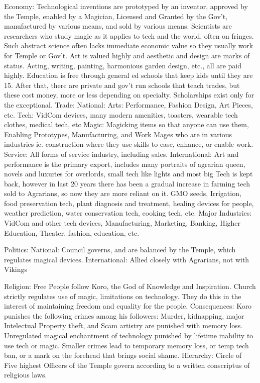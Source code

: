 \documentclass[blue]{GL2020}
\begin{document}
Economy:		Technological inventions are prototyped by an inventor, approved by the Temple, enabled by a
						Magician, Licensed and Granted by the Gov't, manufactured by various means, and sold by 
						various means.  Scientists are researchers who study magic as it applies to tech and the world, 
						often on fringes. Such abstract science often lacks immediate economic value 
						so they usually work for Temple or Gov't.  Art is valued highly and aesthetic and design are marks
						of status.  Acting, writing, painting, harmonious garden design, etc., all are paid highly.
						Education is free through general ed schools that keep kids until they are 15.  After that, there
						are private and gov't run schools that teach trades, but these cost money, more or less depending 
						on specialty.  Scholarships exist only for the exceptional.
	Trade:		National:		Arts:		Performance, Fashion Design, Art Pieces, etc.
												Tech:		VidCom devices, many modern amenities, toasters, wearable tech clothes, 
												medical tech, etc
												Magic:		Magicking items so that anyone can use them, Enabling Prototypes,
												Manufacturing, and Work Mages who are in various industries ie. construction 
												where they use skills to ease, enhance, or enable work.
												Service:		All forms of service industry, including sales.
						International:		Art and performance is the primary export, includes many portraits of agrarian 
												queen, novels and luxuries for overlords, small tech like lights and most big Tech is
												kept back, however in last 20 years there has been a gradual increase in farming tech
												sold to Agrarians, so now they are more reliant on it.  GMO seeds, Irrigation, food
												preservation tech, plant diagnosis and treatment, healing devices for people, weather
												prediction, water conservation tech, cooking tech, etc.
	Major Industries:  VidCom and other tech devices, Manufacturing, Marketing, Banking, Higher Education, 
									Theater, fashion, education, etc.
	
Politics:
	National: Council governs, and are balanced by the Temple, which regulates magical devices.
	International:  Allied closely with Agrarians, not with Vikings
	
Religion:		Free People follow Koro, the God of Knowledge and Inspiration.  Church strictly regulates use of
						magic, limitations on technology.  They do this in the interest of maintaining freedom and 
						equality for the people.  
	Consequences:  Koro punishes the following crimes among his followers:  Murder, kidnapping, major 
						Intelectual Property theft, and Scam artistry are punished with memory loss.  Unregulated 
						magical enchantment of technology punished by lifetime inability to use tech or magic.  
						Smaller crimes lead to temporary memory loss, or temp tech ban, or a mark on the forehead 
						that brings social shame.
	Hierarchy:  Circle of Five highest Officers of the Temple govern according to a written conscriptus of
						religious laws.
	
\end{document}
